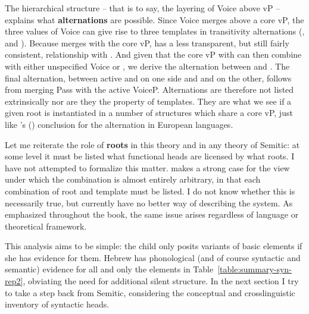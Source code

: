 \begin{exe}
\begin{xlist}
\begin{xlist}
\begin{xlist}
\begin{xlist}
\begin{xlist}
\begin{xlist}
\begin{exe}
\begin{xlist}
\begin{exe}
\begin{exe}
\begin{xlist}
\begin{exe}
The hierarchical structure -- that is to say, the layering of Voice above vP -- explains what \textbf{alternations} are possible. Since Voice merges above a core vP, the three values of Voice can give rise to three templates in transitivity alternations ({\tkal}, {\tnif} and {\thif}). Because {\va} merges with the core vP, {\tpie} has a less transparent, but still fairly consistent, relationship with {\tkal}. And given that the core vP with {\va} can then combine with either unspecified Voice or {\vz}, we derive the alternation between {\tpie} and {\thit}. The final alternation, between active {\tpie} and {\thif} on one side and  {\tpua} and {\thuf} on the other, follows from merging Pass with the active VoiceP. Alternations are therefore not listed extrinsically nor are they the property of templates. They are what we see if a given root is instantiated in a number of structures which share a core vP, just like \citeauthor{schaefer08}'s (\citeyear{schaefer08}) conclusion for the  alternation in European languages.

Let me reiterate the role of \textbf{roots} in this theory and in any theory of Semitic: at some level it must be listed what functional heads are licensed by what roots. I have not attempted to formalize this matter. \cite{arad05} makes a strong case for the view under which the combination is almost entirely arbitrary, in that each combination of root and template must be listed. I do not know whether this is necessarily true, but currently have no better way of describing the system. As emphasized throughout the book, the same issue arises regardless of language or theoretical framework.

This analysis aims to be simple: the child only posits variants of basic elements if she has evidence for them. Hebrew has phonological (and of course syntactic and semantic) evidence for all and only the elements in Table~\ref{table:summary-syn-rep2}, obviating the need for additional silent structure. In the next section I try to take a step back from Semitic, considering the conceptual and crosslinguistic inventory of syntactic heads.



\end{exe}
\end{xlist}
\end{exe}
\end{exe}
\end{xlist}
\end{exe}
\end{xlist}
\end{xlist}
\end{xlist}
\end{xlist}
\end{xlist}
\end{xlist}
\end{exe}
